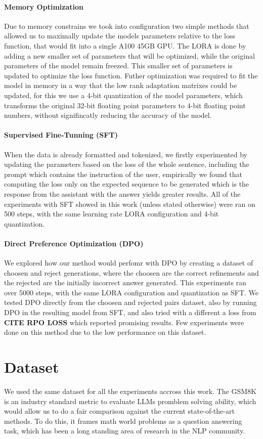 \documentclass[a4paper,10pt]{article}
\begin{document}
\paragraph {Memory Optimization}
Due to memory constrains we took into configuration two simple methods that allowed us to maximally update the models parameters relative to the loss function, that would fit into a single A100 45GB GPU. The LORA is done by adding a new smaller set of parameters that will be optimized, while the original parameters of the model remain freezed. This smaller set of parameters is updated to optimize the loss function. Futher optimization was required to fit the model in memory in a way that the low rank adaptation matrixes could be updated, for this we use a 4-bit quantization of the model parameters, which transforms the original 32-bit floating point parameters to 4-bit floating point numbers, without signifincatly reducing the accuracy of the model. 
\paragraph{Supervised Fine-Tunning (SFT)}
When the data is already formatted and tokenized, we firstly experimented by updating the parameters based on the loss of the whole sentence, including the prompt which contains the instruction of the user, empirically we found that computing the loss only on the expected sequence to be generated which is the response from the assistant with the answer yields greater results. All of the experiments with SFT showed in this work (unless stated otherwise) were ran on 500 steps, with the same learning rate LORA configuration and 4-bit quantization.
\paragraph{Direct Preference Optimization (DPO)}
We explored how our method would perfomr with DPO by creating a dataset of choosen and reject generations, where the choosen are the correct refinements and the rejected are the initially incorrect answer generated. This experiments ran over 5000 steps, with the same LORA configuration and quantization as SFT. We tested DPO directly from the choosen and rejected pairs dataset, also by running DPO in the resulting model from SFT, and also tried with a different a loss from \textbf{CITE RPO LOSS} which reported promising results. Few experiments were done on this method due to the low performance on this dataset.

\section{Dataset}
We used the same dataset for all the experiments accross this work. The GSM8K is an industry standard metric to evaluate LLMs promblem solving ability, which would allow us to do a fair comparison against the current state-of-the-art methods. To do this, it frames math world problems as a question answering task, which has been a long standing area of research in the NLP community. 
\end{document}

